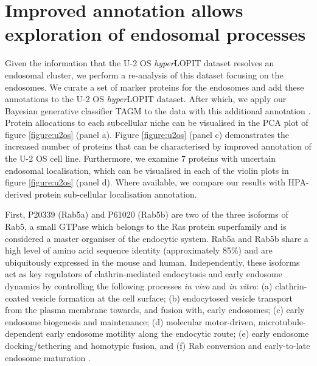 \documentclass[12pt,english]{article}
\begin{document}
\section{Improved annotation allows exploration of endosomal processes}
Given the information that the U-2 OS \textit{hyper}LOPIT dataset resolves an endosomal cluster, we perform a re-analysis of this dataset focusing on the endosomes. We curate a set of marker proteins for the endosomes and add these annotations to the U-2 OS \textit{hyper}LOPIT dataset. After which, we apply our Bayesian generative classifier TAGM to the data with this additional annotation \citep{Crook:2018}. Protein allocations to each subcellular niche can be visualised in the PCA plot of figure \ref{figure:u2os} (panel a). Figure \ref{figure:u2os} (panel c) demonstrates the increased number of proteins that can be characterised by improved annotation of the U-2 OS cell line. Furthermore, we examine $7$ proteins with uncertain endosomal localisation, which can be visualised in each of the violin plots in figure \ref{figure:u2os} (panel d). Where available, we compare our results with HPA-derived protein sub-cellular localisation annotation.


First, P20339 (Rab5a) and P61020 (Rab5b) are two of the three isoforms of Rab5, a small GTPase which belongs to the Ras protein superfamily and is considered a master organiser of the endocytic system. Rab5a and Rab5b share a high level of amino acid sequence identity (approximately 85\%) and are ubiquitously expressed in the mouse and human. Independently, these isoforms act as key regulators of clathrin-mediated endocytosis and early endosome dynamics by controlling the following processes \textit{in vivo} and \textit{in vitro}: (a) clathrin-coated vesicle formation at the cell surface; (b) endocytosed vesicle transport from the plasma membrane towards, and fusion with, early endosomes; (c) early endosome biogenesis and maintenance; (d) molecular motor-driven, microtubule-dependent early endosome motility along the endocytic route; (e) early endosome docking/tethering and homotypic fusion, and (f) Rab conversion and early-to-late endosome maturation
\citep{Simonsen::1998, Zerial::2001, Rink::2005, Chen::2014, Gautreau::2014, Law::2017}.
\end{document}
